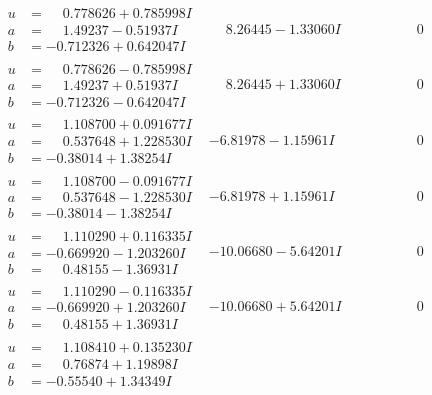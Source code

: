 \documentclass[1p]{elsarticle_modified}
\theoremstyle{definition}
\begin{document}
$$\begin{array}{c|c|c}
\begin{aligned}
u &= \phantom{-}0.778626 + 0.785998 I \\
a &= \phantom{-}1.49237 - 0.51937 I \\
b &= -0.712326 + 0.642047 I\end{aligned}
 & \phantom{-}8.26445 - 1.33060 I & \phantom{-0.000000 } 0 \\ \hline\begin{aligned}
u &= \phantom{-}0.778626 - 0.785998 I \\
a &= \phantom{-}1.49237 + 0.51937 I \\
b &= -0.712326 - 0.642047 I\end{aligned}
 & \phantom{-}8.26445 + 1.33060 I & \phantom{-0.000000 } 0 \\ \hline\begin{aligned}
u &= \phantom{-}1.108700 + 0.091677 I \\
a &= \phantom{-}0.537648 + 1.228530 I \\
b &= -0.38014 + 1.38254 I\end{aligned}
 & -6.81978 - 1.15961 I & \phantom{-0.000000 } 0 \\ \hline\begin{aligned}
u &= \phantom{-}1.108700 - 0.091677 I \\
a &= \phantom{-}0.537648 - 1.228530 I \\
b &= -0.38014 - 1.38254 I\end{aligned}
 & -6.81978 + 1.15961 I & \phantom{-0.000000 } 0 \\ \hline\begin{aligned}
u &= \phantom{-}1.110290 + 0.116335 I \\
a &= -0.669920 - 1.203260 I \\
b &= \phantom{-}0.48155 - 1.36931 I\end{aligned}
 & -10.06680 - 5.64201 I & \phantom{-0.000000 } 0 \\ \hline\begin{aligned}
u &= \phantom{-}1.110290 - 0.116335 I \\
a &= -0.669920 + 1.203260 I \\
b &= \phantom{-}0.48155 + 1.36931 I\end{aligned}
 & -10.06680 + 5.64201 I & \phantom{-0.000000 } 0 \\ \hline\begin{aligned}
u &= \phantom{-}1.108410 + 0.135230 I \\
a &= \phantom{-}0.76874 + 1.19898 I \\
b &= -0.55540 + 1.34349 I\end{aligned}

\end{array}$$
\end{document}
